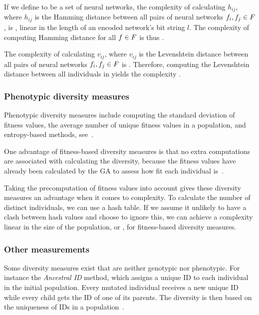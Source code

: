 If we define \indset{} to be a set of neural networks, the complexity of calculating $h_{ij}$, where $h_{ij}$ is the Hamming distance between all pairs of neural networks $f_i, f_j \in F$, is \bigO{\bitstringl}, linear in the length of an encoded network's bit string $l$. The complexity of computing Hamming distance for all $f \in F$ is thus \bigO{\indsetl^2 \cdot \bitstringl}. 

The complexity of calculating $v_{ij}$, where $v_{ij}$ is the Levenshtein distance between all pairs of neural networks $f_i, f_j \in F$ is \cite{Freeman:2006:CLN:1220835.1220895}. Therefore, computing the Levenshtein distance between all individuals in \indset{} yields the complexity .

\subsubsection{Phenotypic diversity measures}
Phenotypic diversity measures include computing the standard deviation of fitness values, the average number of unique fitness values in a population, and entropy-based methods, see~\cite{1250187, 1266373}.

One advantage of fitness-based diversity measures is that no extra computations are associated with calculating the diversity, because the fitness values have already been calculated by the GA to assess how fit each individual is~\cite{Nguyen:2006:ASPGP}.

Taking the precomputation of fitness values into account gives these diversity measures an advantage when it comes to complexity. To calculate the number of distinct individuals, we can use a hash table. If we assume it unlikely to have a clash between hash values and choose to ignore this, we can achieve a complexity linear in the size of the population, or \bigO{\indsetl}, for fitness-based diversity measures.

\subsubsection{Other measurements}
Some diversity measures exist that are neither genotypic nor phenotypic. For instance the \emph{Ancestral ID} method, which assigns a unique ID to each individual in the initial population. Every mutated individual receives a new unique ID while every child gets the ID of one of its parents. The diversity is then based on the uniqueness of IDs in a population~\cite{1250187}.
